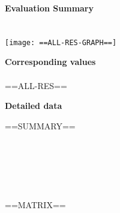 \documentclass[12pt,a4paper]{article}
\begin{document}
\centering
\vspace{-3cm}
\textbf{\Huge{Evaluation Summary}\\~\\~\\\normalsize}
\texttt{[image: ==ALL-RES-GRAPH==]}

\textbf{Corresponding values}\\~\\

==ALL-RES==

\newpage
\textbf{Detailed data}

==SUMMARY==

~\\~\\

~\\~\\~\\

==MATRIX==
\end{document}
